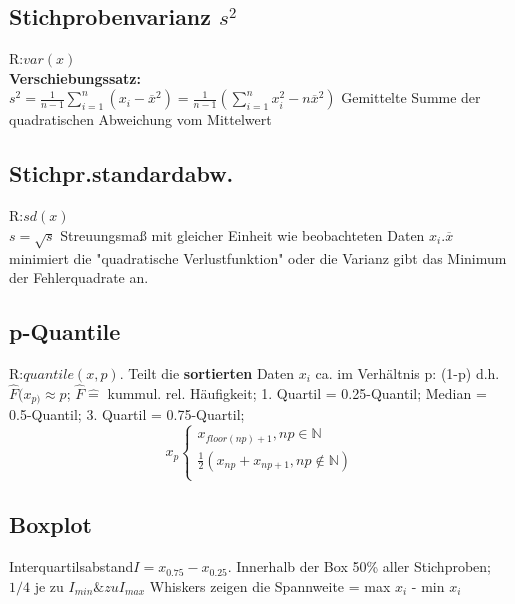     \subsection{Stichprobenvarianz $s^2$}
    R:$var(x)$\\
    \textbf{Verschiebungssatz:}\\
      $s^2 = \frac{1}{n-1} \sum_{i=1}^{n}(x_{i} - \overline{x}^2) = \frac{1}{n-1} (\sum_{i=1}^{n} x_{i}^2 - n\overline{x}^2)$
      Gemittelte Summe der quadratischen Abweichung vom Mittelwert
      \subsection{Stichpr.standardabw.}
      R:$sd(x)$\\
      $s=\sqrt{s}$
      Streuungsmaß mit gleicher Einheit wie beobachteten Daten $x_{i}$.$ \overline{x}$ minimiert die "quadratische Verlustfunktion" oder die Varianz gibt das Minimum der Fehlerquadrate an.
      \subsection{p-Quantile}
      R:$quantile(x,p)$. Teilt die \textbf{sortierten} Daten $x_{i}$ ca. im Verhältnis p: (1-p) d.h. $\hat{F}(x_{p)} \approx p$; 
      $\hat{F} \hat{=} $ kummul. rel. Häufigkeit; 
      1. Quartil = 0.25-Quantil; 
      Median = 0.5-Quantil; 
      3. Quartil = 0.75-Quartil; 
      \begin{equation*}
      	x_{p}
        \begin{cases}
          x_{floor(np) +1} , np \in \mathbb{N}\\
          \frac{1}{2} (x_{np} + x_{np+1}, np \notin \mathbb{N})\\
        \end{cases}
      \end{equation*}
      \subsection{Boxplot}
      Interquartilsabstand$I = x_{0.75} - x_{0.25}$.
      Innerhalb der Box 50\% aller Stichproben; 
      $ 1/4 $ je zu $ I_{min} \& zu I_{max} $
      Whiskers zeigen die Spannweite =  max $x_{i} $ - min $ x_{i}$
      
